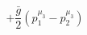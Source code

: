 %
\begin{dmath*}
%
  +  \frac{{\bar g}{}}{2} \left(p_1^{\mu_3} - p_2^{\mu_3}\right)
%
\end{dmath*}
%
